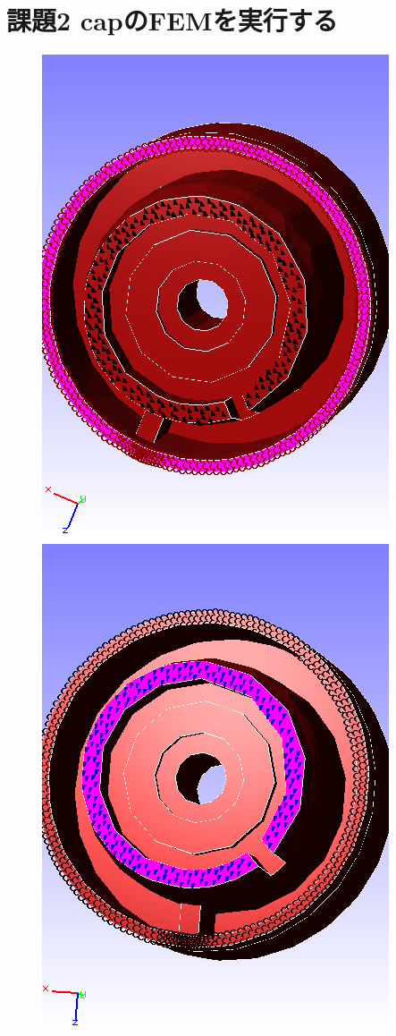 \documentclass[a4paper,11pt]{jsarticle}
\begin{document}
\section*{課題2 capのFEMを実行する}
\begin{figure}[h]
  \begin{minipage}[b]{0.32\linewidth}
    \centering
    \includegraphics[scale=0.3]{cap_face03_boundary.png}
  \end{minipage}
  \begin{minipage}[b]{0.32\linewidth}
    \centering
    \includegraphics[scale=0.3]{cap_face010_dload.png}

\end{minipage}
\end{figure}
\end{document}
